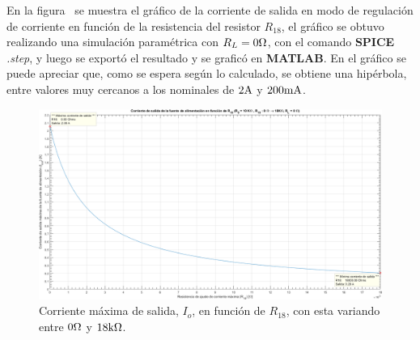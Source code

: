 \vspace{1.5cm}


En la figura~ se muestra el gráfico de la corriente de salida en modo de regulación de corriente en función de la resistencia del resistor $R_{18}$, el gráfico se obtuvo realizando una simulación paramétrica con $R_{L} = 0 \si[per-mode=symbol]{\ohm}$, con el comando \textbf{SPICE} \textit{.step}, y luego se exportó el resultado y se graficó en \textbf{MATLAB}. En el gráfico se puede apreciar que, como se espera según lo calculado, se obtiene una hipérbola, entre valores muy cercanos a los nominales de $2 \si[per-mode=symbol]{\ampere}$ y $200 \si[per-mode=symbol]{\milli\ampere}$.




\vfill

\clearpage

\begin{figure}[H] %
\begin{center}
\includegraphics[width=1.2 \textwidth, angle=90]{./img/preguntas/p7.png}
\caption{\label{fig:fig_p7_output_current}\footnotesize{Corriente máxima de salida, $I_{o}$, en función de $R_{18}$, con esta variando entre $0 \si[per-mode=symbol]{\ohm}$ y $18 \si[per-mode=symbol]{\kilo\ohm}$.}}
\end{center}
\end{figure}



\clearpage